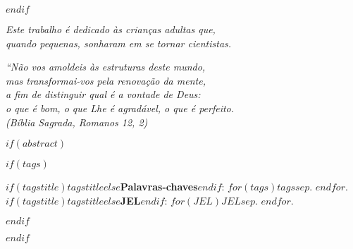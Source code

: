 \documentclass[$if(fontsize)$$fontsize$,$endif$$if(lang)$$lang$,$endif$$if(papersize)$$papersize$,$endif$$for(classoption)$$classoption$$sep$,$endfor$]{$documentclass$}	%
\begin{document}
$endif$


\newpage


\begin{dedicatoria}
	\vspace*{\fill}
	\centering
	\noindent
	\textit{ Este trabalho é dedicado às crianças adultas que,\\
		quando pequenas, sonharam em se tornar cientistas.} \vspace*{\fill}
\end{dedicatoria}

\begin{agradecimentos}


	
\end{agradecimentos}

\begin{epigrafe}
	\vspace*{\fill}
	\begin{flushright}
		\textit{``Não vos amoldeis às estruturas deste mundo, \\
			mas transformai-vos pela renovação da mente, \\
			a fim de distinguir qual é a vontade de Deus: \\
			o que é bom, o que Lhe é agradável, o que é perfeito.\\
			(Bíblia Sagrada, Romanos 12, 2)}
	\end{flushright}
\end{epigrafe}




$if(abstract)$
\setlength{\absparsep}{18pt} %
\begin{resumoumacoluna}
	
	
	$if(tags)$
	\vspace{\onelineskip}
	
	\noindent
	\textbf{$if(tagstitle)$$tagstitle$$else$Palavras-chaves$endif$}: $for(tags)$$tags$$sep$. $endfor$. \\	%
	\textbf{$if(tagstitle)$$tagstitle$$else$JEL$endif$}: $for(JEL)$$JEL$$sep$. $endfor$.	%
	
	
	$endif$
\end{resumoumacoluna}
$endif$
\end{document}

